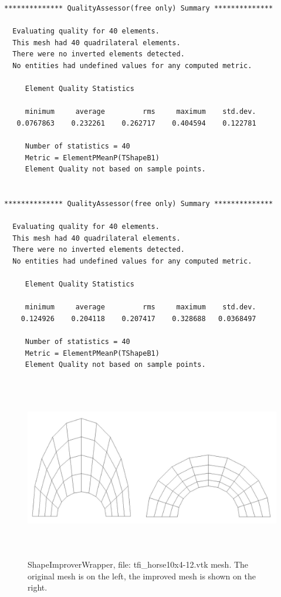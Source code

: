 \begin{verbatim}
************** QualityAssessor(free only) Summary **************

  Evaluating quality for 40 elements.
  This mesh had 40 quadrilateral elements.
  There were no inverted elements detected.
  No entities had undefined values for any computed metric.

     Element Quality Statistics

     minimum     average         rms     maximum    std.dev.
   0.0767863    0.232261    0.262717    0.404594    0.122781

     Number of statistics = 40
     Metric = ElementPMeanP(TShapeB1)
     Element Quality not based on sample points.


************** QualityAssessor(free only) Summary **************

  Evaluating quality for 40 elements.
  This mesh had 40 quadrilateral elements.
  There were no inverted elements detected.
  No entities had undefined values for any computed metric.

     Element Quality Statistics

     minimum     average         rms     maximum    std.dev.
    0.124926    0.204118    0.207417    0.328688   0.0368497

     Number of statistics = 40
     Metric = ElementPMeanP(TShapeB1)
     Element Quality not based on sample points.
\end{verbatim}

\begin{figure}[htbp]
\begin{center}
    \includegraphics[height=80mm]{figures/horseshoe-10x4}
    \caption{ShapeImproverWrapper, file: tfi\_horse10x4-12.vtk mesh. The original mesh is on the left, the improved mesh is shown on the right.}
    \label{fig:inverted-hole-1}
\end{center}
\end{figure}

